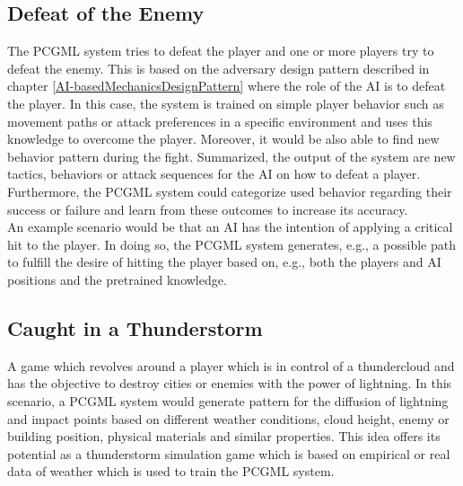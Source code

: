 \documentclass[MGS,Master,english]{twbook}%
\begin{document}
\subsection{Defeat of the Enemy} \label{idea::defeatTheEnemy}
The PCGML system tries to defeat the player and one or more players try to defeat the enemy. This is based on the adversary design pattern described in chapter \ref{AI-basedMechanicsDesignPattern} where the role of the AI is to defeat the player. In this case, the system is trained on simple player behavior such as movement paths or attack  preferences in a specific environment and uses this knowledge to overcome the player. Moreover, it would be also able to find new behavior pattern during the fight. Summarized, the output of the system are new tactics, behaviors or attack sequences for the AI on how to defeat a player. Furthermore, the PCGML system could categorize used behavior regarding their success or failure and learn from these outcomes to increase its accuracy. \\
An example scenario would be that an AI has the intention of applying a critical hit to the player. In doing so, the PCGML system generates, e.g., a possible path to fulfill the desire of hitting the player based on, e.g., both the players and AI positions and the pretrained knowledge.

\subsection{Caught in a Thunderstorm} \label{idea::caughtInAThunderstorm}
A game which revolves around a player which is in control of a thundercloud and has the objective to destroy cities or enemies with the power of lightning. In this scenario, a PCGML system would generate pattern for the diffusion of lightning and impact points based on different weather conditions, cloud height, enemy or building position, physical materials and similar properties. This idea offers its potential as a thunderstorm simulation game which is based on empirical or real data of weather which is used to train the PCGML system.
\end{document}
